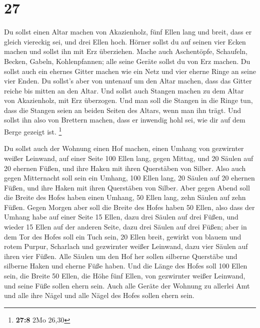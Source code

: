 \hypertarget{section-26}{%
\section{27}\label{section-26}}

 Du sollst einen Altar machen von Akazienholz, fünf Ellen
lang und breit, dass er gleich viereckig sei, und drei Ellen hoch.
 Hörner sollst du auf seinen vier Ecken machen und sollst
ihn mit Erz überziehen.  Mache auch Aschentöpfe,
Schaufeln, Becken, Gabeln, Kohlenpfannen; alle seine Geräte sollst du
von Erz machen.  Du sollst auch ein ehernes Gitter machen
wie ein Netz und vier eherne Ringe an seine vier Enden. 
Du sollst's aber von untenauf um den Altar machen, dass das Gitter
reiche bis mitten an den Altar.  Und sollst auch Stangen
machen zu dem Altar von Akazienholz, mit Erz überzogen. 
Und man soll die Stangen in die Ringe tun, dass die Stangen seien an
beiden Seiten des Altars, wenn man ihn trägt.  Und sollst
ihn also von Brettern machen, dass er inwendig hohl sei, wie dir auf dem
Berge gezeigt ist. \footnote{\textbf{27:8} 2Mo 26,30}

 Du sollst auch der Wohnung einen Hof machen, einen Umhang
von gezwirnter weißer Leinwand, auf einer Seite 100 Ellen lang, gegen
Mittag,  und 20 Säulen auf 20 ehernen Füßen, und ihre
Haken mit ihren Querstäben von Silber.  Also auch gegen
Mitternacht soll sein ein Umhang, 100 Ellen lang, 20 Säulen auf 20
ehernen Füßen, und ihre Haken mit ihren Querstäben von Silber.
 Aber gegen Abend soll die Breite des Hofes haben einen
Umhang, 50 Ellen lang, zehn Säulen auf zehn Füßen.  Gegen
Morgen aber soll die Breite des Hofes haben 50 Ellen, 
also dass der Umhang habe auf einer Seite 15 Ellen, dazu drei Säulen auf
drei Füßen,  und wieder 15 Ellen auf der anderen Seite,
dazu drei Säulen auf drei Füßen;  aber in dem Tor des
Hofes soll ein Tuch sein, 20 Ellen breit, gewirkt von blauem und rotem
Purpur, Scharlach und gezwirnter weißer Leinwand, dazu vier Säulen auf
ihren vier Füßen.  Alle Säulen um den Hof her sollen
silberne Querstäbe und silberne Haken und eherne Füße haben.
 Und die Länge des Hofes soll 100 Ellen sein, die Breite
50 Ellen, die Höhe fünf Ellen, von gezwirnter weißer Leinwand, und seine
Füße sollen ehern sein.  Auch alle Geräte der Wohnung zu
allerlei Amt und alle ihre Nägel und alle Nägel des Hofes sollen ehern
sein.

